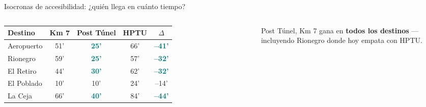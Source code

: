 \documentclass[aspectratio=169, 11pt]{beamer}
\newcommand{\highlight}[1]{\textcolor{teal}{\textbf{#1}}}
\begin{document}
\begin{frame}{Isocronas de accesibilidad: ¿quién llega en cuánto tiempo?}
\begin{columns}[T]
\vspace{6pt}
{\scriptsize
\begin{tabular}{@{}lcccc@{}}
\toprule
\textbf{Destino} & \textbf{Km 7} & \textbf{Post Túnel} & \textbf{HPTU} & \textbf{$\Delta$} \\
\midrule
\rowcolor{teal!8}
Aeropuerto & 51' & \highlight{25'} & 66' & \highlight{--41'} \\
\rowcolor{teal!8}
Rionegro & 59' & \highlight{25'} & 57' & \highlight{--32'} \\
El Retiro & 44' & \highlight{30'} & 62' & \highlight{--32'} \\
El Poblado & 10' & 10' & 24' & --14' \\
\rowcolor{teal!6}
La Ceja & 66' & \highlight{40'} & 84' & \highlight{--44'} \\
\bottomrule
\end{tabular}
}

\vspace{6pt}
{\footnotesize Post Túnel, Km 7 gana en \textbf{todos los destinos} --- incluyendo Rionegro donde hoy empata con HPTU.}
\end{columns}
\end{frame}
\end{document}
